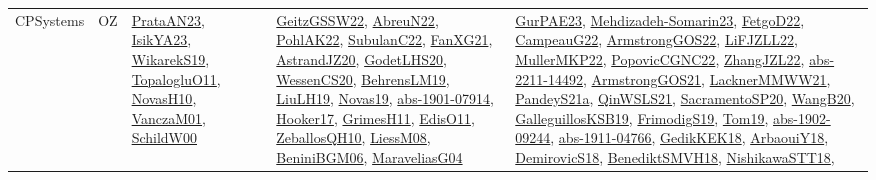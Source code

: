 {\begin{longtable}{lp{3cm}>{\raggedright}p{6cm}>{\raggedright}p{6cm}p{8cm}}
CPSystems & OZ & \href{articles/PrataAN23.pdf}{PrataAN23}\cite{PrataAN23}, \href{articles/IsikYA23.pdf}{IsikYA23}\cite{IsikYA23}, \href{articles/WikarekS19.pdf}{WikarekS19}\cite{WikarekS19}, \href{articles/TopalogluO11.pdf}{TopalogluO11}\cite{TopalogluO11}, \href{articles/NovasH10.pdf}{NovasH10}\cite{NovasH10}, \href{papers/VanczaM01.pdf}{VanczaM01}\cite{VanczaM01}, \href{articles/SchildW00.pdf}{SchildW00}\cite{SchildW00} & \href{papers/GeitzGSSW22.pdf}{GeitzGSSW22}\cite{GeitzGSSW22}, \href{articles/AbreuN22.pdf}{AbreuN22}\cite{AbreuN22}, \href{articles/PohlAK22.pdf}{PohlAK22}\cite{PohlAK22}, \href{articles/SubulanC22.pdf}{SubulanC22}\cite{SubulanC22}, \href{articles/FanXG21.pdf}{FanXG21}\cite{FanXG21}, \href{articles/AstrandJZ20.pdf}{AstrandJZ20}\cite{AstrandJZ20}, \href{papers/GodetLHS20.pdf}{GodetLHS20}\cite{GodetLHS20}, \href{papers/WessenCS20.pdf}{WessenCS20}\cite{WessenCS20}, \href{papers/BehrensLM19.pdf}{BehrensLM19}\cite{BehrensLM19}, \href{papers/LiuLH19.pdf}{LiuLH19}\cite{LiuLH19}, \href{articles/Novas19.pdf}{Novas19}\cite{Novas19}, \href{articles/abs-1901-07914.pdf}{abs-1901-07914}\cite{abs-1901-07914}, \href{papers/Hooker17.pdf}{Hooker17}\cite{Hooker17}, \href{papers/GrimesH11.pdf}{GrimesH11}\cite{GrimesH11}, \href{papers/EdisO11.pdf}{EdisO11}\cite{EdisO11}, \href{articles/ZeballosQH10.pdf}{ZeballosQH10}\cite{ZeballosQH10}, \href{articles/LiessM08.pdf}{LiessM08}\cite{LiessM08}, \href{papers/BeniniBGM06.pdf}{BeniniBGM06}\cite{BeniniBGM06}, \href{papers/MaraveliasG04.pdf}{MaraveliasG04}\cite{MaraveliasG04} & \href{articles/GurPAE23.pdf}{GurPAE23}\cite{GurPAE23}, \href{papers/Mehdizadeh-Somarin23.pdf}{Mehdizadeh-Somarin23}\cite{Mehdizadeh-Somarin23}, \href{articles/FetgoD22.pdf}{FetgoD22}\cite{FetgoD22}, \href{articles/CampeauG22.pdf}{CampeauG22}\cite{CampeauG22}, \href{papers/ArmstrongGOS22.pdf}{ArmstrongGOS22}\cite{ArmstrongGOS22}, \href{papers/LiFJZLL22.pdf}{LiFJZLL22}\cite{LiFJZLL22}, \href{articles/MullerMKP22.pdf}{MullerMKP22}\cite{MullerMKP22}, \href{papers/PopovicCGNC22.pdf}{PopovicCGNC22}\cite{PopovicCGNC22}, \href{papers/ZhangJZL22.pdf}{ZhangJZL22}\cite{ZhangJZL22}, \href{articles/abs-2211-14492.pdf}{abs-2211-14492}\cite{abs-2211-14492}, \href{papers/ArmstrongGOS21.pdf}{ArmstrongGOS21}\cite{ArmstrongGOS21}, \href{papers/LacknerMMWW21.pdf}{LacknerMMWW21}\cite{LacknerMMWW21}, \href{articles/PandeyS21a.pdf}{PandeyS21a}\cite{PandeyS21a}, \href{articles/QinWSLS21.pdf}{QinWSLS21}\cite{QinWSLS21}, \href{articles/SacramentoSP20.pdf}{SacramentoSP20}\cite{SacramentoSP20}, \href{papers/WangB20.pdf}{WangB20}\cite{WangB20}, \href{papers/GalleguillosKSB19.pdf}{GalleguillosKSB19}\cite{GalleguillosKSB19}, \href{papers/FrimodigS19.pdf}{FrimodigS19}\cite{FrimodigS19}, \href{papers/Tom19.pdf}{Tom19}\cite{Tom19}, \href{articles/abs-1902-09244.pdf}{abs-1902-09244}\cite{abs-1902-09244}, \href{articles/abs-1911-04766.pdf}{abs-1911-04766}\cite{abs-1911-04766}, \href{articles/GedikKEK18.pdf}{GedikKEK18}\cite{GedikKEK18}, \href{papers/ArbaouiY18.pdf}{ArbaouiY18}\cite{ArbaouiY18}, \href{papers/DemirovicS18.pdf}{DemirovicS18}\cite{DemirovicS18}, \href{papers/BenediktSMVH18.pdf}{BenediktSMVH18}\cite{BenediktSMVH18}, \href{papers/NishikawaSTT18.pdf}{NishikawaSTT18}\cite{NishikawaSTT18}, 
\end{longtable}}
